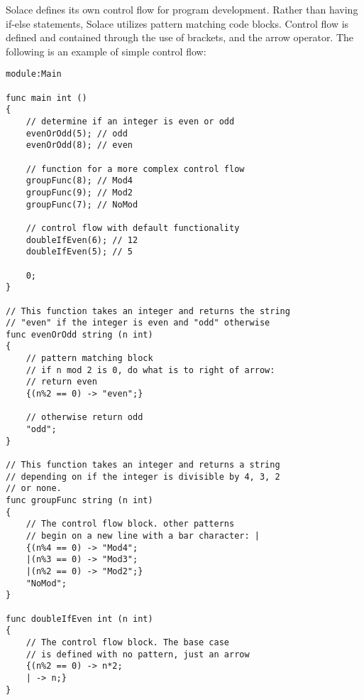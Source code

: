\documentclass{article}
\begin{document}
Solace defines its own control flow for program development. Rather than having if-else
statements, Solace utilizes pattern matching code blocks. Control flow is defined and
contained through the use of brackets, and the arrow operator. The following is an example
of simple control flow:

\begin{lstlisting}
module:Main

func main int ()
{
	// determine if an integer is even or odd
	evenOrOdd(5); // odd
	evenOrOdd(8); // even
	
	// function for a more complex control flow
	groupFunc(8); // Mod4
	groupFunc(9); // Mod2
	groupFunc(7); // NoMod
	
	// control flow with default functionality
	doubleIfEven(6); // 12
	doubleIfEven(5); // 5
	
	0;
}

// This function takes an integer and returns the string
// "even" if the integer is even and "odd" otherwise
func evenOrOdd string (n int)
{
	// pattern matching block
	// if n mod 2 is 0, do what is to right of arrow:
	// return even
	{(n%2 == 0) -> "even";}
	
	// otherwise return odd
	"odd";
}

// This function takes an integer and returns a string
// depending on if the integer is divisible by 4, 3, 2
// or none.
func groupFunc string (n int)
{
	// The control flow block. other patterns
	// begin on a new line with a bar character: |
	{(n%4 == 0) -> "Mod4";
	|(n%3 == 0) -> "Mod3";
	|(n%2 == 0) -> "Mod2";}
	"NoMod";
}

func doubleIfEven int (n int)
{
	// The control flow block. The base case
	// is defined with no pattern, just an arrow
	{(n%2 == 0) -> n*2;
	| -> n;}
}

\end{lstlisting}
\end{document}
